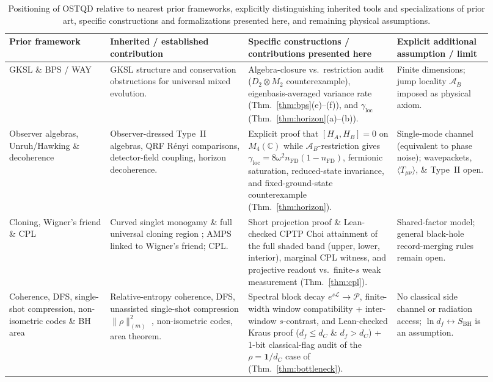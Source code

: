 \documentclass[11pt,a4paper]{article}
\theoremstyle{definition}
\theoremstyle{remark}
\newcommand{\cA}{\mathcal{A}}
\newcommand{\cL}{\mathcal{L}}
\newcommand{\cP}{\mathcal{P}}
\newcommand{\bbC}{\mathbb{C}}
\newcommand{\1}{\mathbf{1}}
\begin{document}
\begin{table}[!tb]
\centering\footnotesize
\caption{Positioning of OSTQD relative to nearest prior frameworks, explicitly distinguishing inherited tools and specializations of prior art, specific constructions and formalizations presented here, and remaining physical assumptions.}
\label{tab:literature}
\begin{tabular}{@{}>{\raggedright\arraybackslash}p{0.19\linewidth}>{\raggedright\arraybackslash}p{0.26\linewidth}>{\raggedright\arraybackslash}p{0.29\linewidth}>{\raggedright\arraybackslash}p{0.18\linewidth}@{}}
\toprule
Prior framework & Inherited / established contribution & Specific constructions / contributions presented here & Explicit additional assumption / limit \\
\midrule
GKSL \& BPS / WAY \cite{Lindblad1976,GKS1976,BPS1984,KuramochiTajima2023} & GKSL structure and conservation obstructions for universal mixed evolution. & Algebra-closure vs.\ restriction audit ($D_2\otimes M_2$ counterexample), eigenbasis-averaged variance rate (Thm.~\ref{thm:bps}(e)--(f)), and $\gamma_{\mathrm{loc}}$ (Thm.~\ref{thm:horizon}(a)--(b)). & Finite dimensions; jump locality $\cA_B$ imposed as physical axiom. \\
Observer algebras, Unruh/Hawking \& decoherence \cite{Hawking1975,Unruh1976,UnruhWald1984,CLPW2023,DeVuyst2024,DeVuyst2025,delaHamette2026,DSW2023} & Observer-dressed Type~II algebras, QRF R\'enyi comparisons, detector-field coupling, horizon decoherence. & Explicit proof that $[H_A,H_B]=0$ on $M_4(\bbC)$ while $\cA_B$-restriction gives $\gamma_{\mathrm{loc}}=8\omega^2 n_{\mathrm{FD}}(1-n_{\mathrm{FD}})$, fermionic saturation, reduced-state invariance, and fixed-ground-state counterexample (Thm.~\ref{thm:horizon}). & Single-mode channel (equivalent to phase noise); wavepackets, $\langle T_{\mu\nu}\rangle$, \& Type~II open. \\
Cloning, Wigner's friend \& CPL \cite{Kay2009,Nechita2021,FrauchigerRenner2018,Bong2020,AdlamRovelli2022,HausmannRenner2025,Walleghem2025,Adlam2026} & Curved singlet monogamy \cite{Kay2009} \& full universal cloning region \cite{Nechita2021}; AMPS linked to Wigner's friend; CPL. & Short projection proof \& Lean-checked CPTP Choi attainment of the full shaded band (upper, lower, interior), marginal CPL witness, and projective readout vs.\ finite-$s$ weak measurement (Thm.~\ref{thm:cpl}). & Shared-factor model; general black-hole record-merging rules remain open. \\
Coherence, DFS, single-shot compression, non-isometric codes \& BH area \cite{Baumgratz2014,Lidar1998,Schumacher1996,FarberGour2026,Akers2022,Hawking1971} & Relative-entropy coherence, DFS, unassisted single-shot compression $\|\rho\|_{(m)}^2$ \cite{FarberGour2026}, non-isometric codes, area theorem. & Spectral block decay $e^{s\cL}\to\cP$, finite-width window compatibility + inter-window $s$-contrast, and Lean-checked Kraus proof ($d_f\le d_C$ \& $d_f>d_C$) + 1-bit classical-flag audit of the $\rho=\1/d_C$ case of \cite{FarberGour2026} (Thm.~\ref{thm:bottleneck}). & No classical side channel or radiation access; $\ln d_f\leftrightarrow S_{\mathrm{BH}}$ is an assumption. \\

\end{tabular}
\end{table}
\end{document}
